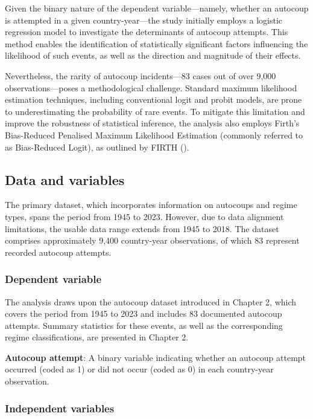 \documentclass[
  12pt,
]{report}
\begin{document}
Given the binary nature of the dependent variable---namely, whether an
autocoup is attempted in a given country-year---the study initially
employs a logistic regression model to investigate the determinants of
autocoup attempts. This method enables the identification of
statistically significant factors influencing the likelihood of such
events, as well as the direction and magnitude of their effects.

Nevertheless, the rarity of autocoup incidents---83 cases out of over
9,000 observations---poses a methodological challenge. Standard maximum
likelihood estimation techniques, including conventional logit and
probit models, are prone to underestimating the probability of rare
events. To mitigate this limitation and improve the robustness of
statistical inference, the analysis also employs Firth's Bias-Reduced
Penalised Maximum Likelihood Estimation (commonly referred to as
Bias-Reduced Logit), as outlined by FIRTH
().

\subsection*{Data and variables}\label{data-and-variables}

The primary dataset, which incorporates information on autocoups and
regime types, spans the period from 1945 to 2023. However, due to data
alignment limitations, the usable data range extends from 1945 to 2018.
The dataset comprises approximately 9,400 country-year observations, of
which 83 represent recorded autocoup attempts.

\subsubsection*{Dependent variable}\label{dependent-variable}

The analysis draws upon the autocoup dataset introduced in Chapter 2,
which covers the period from 1945 to 2023 and includes 83 documented
autocoup attempts. Summary statistics for these events, as well as the
corresponding regime classifications, are presented in Chapter 2.

\textbf{Autocoup attempt}: A binary variable indicating whether an
autocoup attempt occurred (coded as 1) or did not occur (coded as 0) in
each country-year observation.

\subsubsection*{Independent variables}\label{independent-variables}
\end{document}
